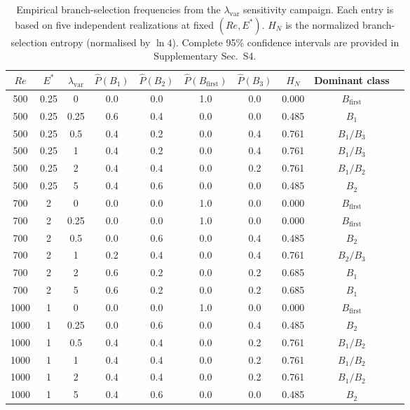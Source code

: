 \documentclass[a4paper,11pt]{article}
\begin{document}
\begin{table}[t]
\centering
\caption{Empirical branch-selection frequencies from the \(\lambda_{\mathrm{var}}\)
sensitivity campaign. Each entry is based on five independent realizations at
fixed \((Re,E^*)\). \(H_N\) is the normalized branch-selection entropy
(normalised by \(\ln 4\)). Complete
95\% confidence intervals are provided in Supplementary Sec.~S4.}
\label{tab:lambda_branch_selection}
\scriptsize
\begin{tabular}{cccccccccc}
\toprule
\(Re\) & \(E^*\) & \(\lambda_{\mathrm{var}}\) & \(\widehat P(B_1)\) & \(\widehat P(B_2)\) & \(\widehat P(B_{\mathrm{first}})\) & \(\widehat P(B_3)\) & \(H_N\) & Dominant class\\
\midrule
500  & 0.25 & 0    & 0.0 & 0.0 & 1.0 & 0.0 & 0.000 & \(B_{\mathrm{first}}\)\\
500  & 0.25 & 0.25 & 0.6 & 0.4 & 0.0 & 0.0 & 0.485 & \(B_1\)\\
500  & 0.25 & 0.5  & 0.4 & 0.2 & 0.0 & 0.4 & 0.761 & \(B_1/B_3\)\\
500  & 0.25 & 1    & 0.4 & 0.2 & 0.0 & 0.4 & 0.761 & \(B_1/B_3\)\\
500  & 0.25 & 2    & 0.4 & 0.4 & 0.0 & 0.2 & 0.761 & \(B_1/B_2\)\\
500  & 0.25 & 5    & 0.4 & 0.6 & 0.0 & 0.0 & 0.485 & \(B_2\)\\
\midrule
700  & 2    & 0    & 0.0 & 0.0 & 1.0 & 0.0 & 0.000 & \(B_{\mathrm{first}}\)\\
700  & 2    & 0.25 & 0.0 & 0.0 & 1.0 & 0.0 & 0.000 & \(B_{\mathrm{first}}\)\\
700  & 2    & 0.5  & 0.0 & 0.6 & 0.0 & 0.4 & 0.485 & \(B_2\)\\
700  & 2    & 1    & 0.2 & 0.4 & 0.0 & 0.4 & 0.761 & \(B_2/B_3\)\\
700  & 2    & 2    & 0.6 & 0.2 & 0.0 & 0.2 & 0.685 & \(B_1\)\\
700  & 2    & 5    & 0.6 & 0.2 & 0.0 & 0.2 & 0.685 & \(B_1\)\\
\midrule
1000 & 1    & 0    & 0.0 & 0.0 & 1.0 & 0.0 & 0.000 & \(B_{\mathrm{first}}\)\\
1000 & 1    & 0.25 & 0.0 & 0.6 & 0.0 & 0.4 & 0.485 & \(B_2\)\\
1000 & 1    & 0.5  & 0.4 & 0.4 & 0.0 & 0.2 & 0.761 & \(B_1/B_2\)\\
1000 & 1    & 1    & 0.4 & 0.4 & 0.0 & 0.2 & 0.761 & \(B_1/B_2\)\\
1000 & 1    & 2    & 0.4 & 0.4 & 0.0 & 0.2 & 0.761 & \(B_1/B_2\)\\
1000 & 1    & 5    & 0.4 & 0.6 & 0.0 & 0.0 & 0.485 & \(B_2\)\\
\bottomrule
\end{tabular}
\end{table}
\end{document}
